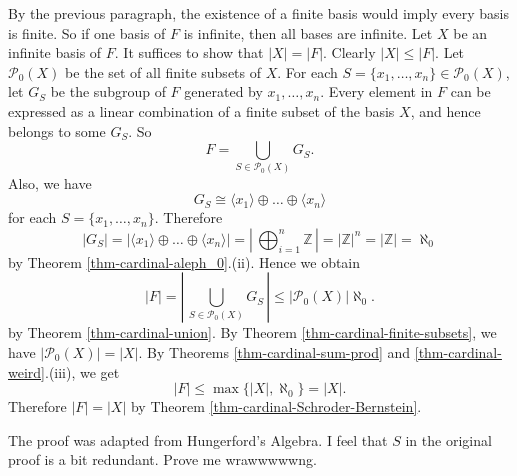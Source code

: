 \begin{sketch}
	By the previous paragraph, the existence of a finite basis would imply every basis is finite. So if one basis of $F$ is infinite, then all bases are infinite. Let $X$ be an infinite basis of $F$. It suffices to show that $|X|=|F|$. Clearly $|X| \le |F|$. Let $ \mathcal{P}_0(X)$ be the set of all finite subsets of $X$.  For each $S=\{x_1, \dots, x_n\} \in \mathcal{P}_0(X)$, let $G_S$ be the subgroup of $F$ generated by $ x_1, \dots, x_n$. Every element in $F$ can be expressed as a linear combination of a finite subset of the basis $X$, and hence belongs to some $G_S$. So 
	\begin{equation*}
		F = \bigcup_{S \in \mathcal{P}_0(X)} G_S.
	\end{equation*}
	Also, we have 
	\begin{equation*}
	G_S \cong \langle x_1 \rangle \oplus \dots \oplus \langle x_n \rangle
	\end{equation*} for each $S = \{x_1,\dots, x_n\}$. Therefore
	\begin{equation*}
		|G_S| = |\langle x_1 \rangle \oplus \dots \oplus \langle x_n \rangle| = \left|\,\bigoplus_{i=1}^n \mathbb{Z}\,\right|= |\mathbb{Z}|^n = |\mathbb{Z}| = \aleph_0
	\end{equation*} by Theorem \ref{thm-cardinal-aleph_0}.(ii).  Hence  we obtain
	\begin{equation*}
		|F| = \left|\,\bigcup_{S \in \mathcal{P}_0(X)} G_S\,\right| \le |\mathcal{P}_0(X)|\aleph_0.
	\end{equation*} by Theorem \ref{thm-cardinal-union}. By Theorem \ref{thm-cardinal-finite-subsets}, we have $|\mathcal{P}_0(X)| = |X|$. By Theorems \ref{thm-cardinal-sum-prod} and \ref{thm-cardinal-weird}.(iii), we get  $$|F| \le  \max\{|X|,\aleph_0\} =   |X|.$$ Therefore $|F| = |X|$ by Theorem \ref{thm-cardinal-Schroder-Bernstein}. 
\end{sketch}
\begin{remark}
	The proof was adapted from Hungerford's Algebra. I feel that $S$ in the original proof is a  bit redundant. Prove me wrawwwwwng.
\end{remark}

